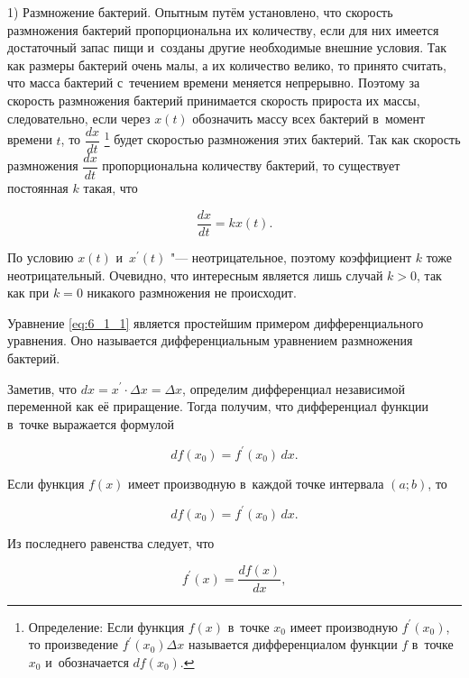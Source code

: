 
1) Размножение бактерий. Опытным путём установлено, что скорость размножения бактерий
пропорциональна их количеству, если для них имеется достаточный запас пищи и~созданы
другие необходимые внешние условия. Так как размеры бактерий очень малы,
а их количество  велико, то принято считать, что масса бактерий с~течением времени
меняется непрерывно. Поэтому за скорость размножения бактерий принимается
скорость прироста их массы, следовательно, если через $x(t)$ обозначить массу всех
бактерий в~момент времени $t$, то $\dfrac{dx}{dt}$ \footnote{ Определение:
Если функция $f(x)$ в~точке $x_{0}$ имеет производную 
$f^\prime(x_{0})$, то произведение $f^\prime (x_{0}) \Delta x$ называется
дифференциалом функции $f$ в~точке $x_{0}$ и~обозначается $df(x_{0})$. }
будет скоростью размножения этих бактерий.
Так как скорость размножения $\dfrac{dx}{dt}$ пропорциональна количеству бактерий,
то существует постоянная $k$ такая, что

\begin{equation}\label{eq:6_1_1}
\dfrac{dx}{dt} = kx(t).
\end{equation}

По условию $x(t)$ и~$x^\prime(t)$ "--- неотрицательное, поэтому коэффициент $k$ тоже
неотрицательный. Очевидно, что интересным является лишь случай $k > 0$, так как при
$k = 0$ никакого размножения не происходит.

Уравнение \eqref{eq:6_1_1} является простейшим примером дифференциального уравнения.
Оно называется дифференциальным уравнением размножения бактерий.

Заметив, что $dx = x^\prime \cdot \Delta x = \Delta x$, определим дифференциал
независимой переменной как её приращение. Тогда получим, что дифференциал функции
в~точке выражается формулой

\begin{equation*}
df(x_{0}) = f^\prime (x_{0}) \, dx.
\end{equation*}

Если функция $f(x)$ имеет производную в~каждой точке интервала $(a; b)$, то 

\begin{equation*}
df(x_{0}) = f^\prime (x_{0}) \, dx.
\end{equation*}

Из последнего равенства следует, что

\begin{equation*}
f^\prime (x) = \dfrac{df(x)}{dx},
\end{equation*}

